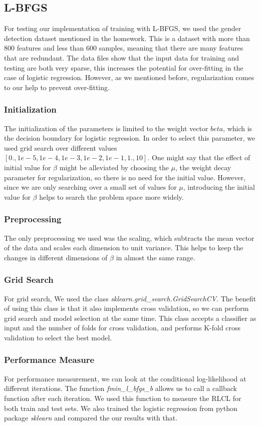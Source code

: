 \documentclass[twoside,12pt]{article}
\begin{document}
\subsection{L-BFGS}
For testing our implementation of training with L-BFGS, we used the gender detection dataset mentioned in the homework. This is a dataset with more than 800 features and less than 600 samples, meaning that there are many features that are redundant. The data files show that the input data for training and testing are both very sparse, this increases the potential for over-fitting in the case of logistic regression. However, as we mentioned before, regularization comes to our help to prevent over-fitting.
\subsubsection{Initialization}
The initialization of the parameters is limited to the weight vector $beta$, which is the decision boundary for logistic regression. In order to select this parameter, we used grid search over different values $[0.,1e-5,1e-4,1e-3,1e-2,1e-1,1.,10]$. One might say that the effect of initial value for $\beta$ might be alleviated by choosing the $\mu$, the weight decay parameter for regularization, so there is no need for the initial value. However, since we are only searching over a small  set of values for $\mu$, introducing the initial value for $\beta$ helps to search the problem space more widely.
\subsubsection{Preprocessing}
The only preprocessing we used was the scaling, which subtracts the mean vector of the data and scales each dimension to unit variance. This helps to keep the changes in different dimensions of $\beta$ in almost the same range.
\subsubsection{Grid Search}
For grid search, We used the class {\it sklearn.grid\_search.GridSearchCV}. The benefit of using this class is that it also implements cross validation, so we can perform grid search and model selection at the same time. This class accepts a classifier as input and the number of folds for cross validation, and performs K-fold cross validation to select the best model.
\subsubsection{Performance Measure}
For performance measurement, we can look at the conditional log-likelihood at different iterations. The function {\it fmin\_l\_bfgs\_b} allows us to call a callback function after each iteration. We used this function to measure the RLCL for both train and test sets. We also trained the logistic regression from python package {\it sklearn} and compared the our results with that.
\end{document}
